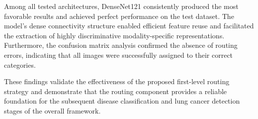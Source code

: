 Among all tested architectures, DenseNet121 consistently produced the most favorable results and achieved perfect performance on the test dataset. The model's dense connectivity structure enabled efficient feature reuse and facilitated the extraction of highly discriminative modality-specific representations. Furthermore, the confusion matrix analysis confirmed the absence of routing errors, indicating that all images were successfully assigned to their correct categories.

These findings validate the effectiveness of the proposed first-level routing strategy and demonstrate that the routing component provides a reliable foundation for the subsequent disease classification and lung cancer detection stages of the overall framework.